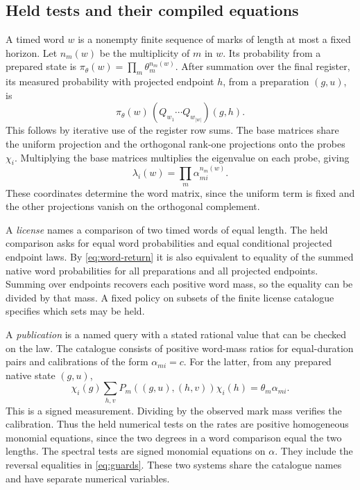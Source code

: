 \subsection{Held tests and their compiled equations}\label{sec:tests}

A timed word \(w\) is a nonempty finite sequence of marks of length at most
a fixed horizon. Let \(n_m(w)\) be the multiplicity of \(m\) in \(w\).
Its probability from a prepared state is
\(\pi_\theta(w)=\prod_m\theta_m^{n_m(w)}\).
After summation over the final register, its measured probability with
projected endpoint \(h\), from a preparation \((g,u)\), is
\begin{equation}\label{eq:word-return}
 \pi_\theta(w)\,(Q_{w_1}\cdots Q_{w_{|w|}})(g,h).
\end{equation}
This follows by iterative use of the register row sums. The base matrices
share the uniform projection and the orthogonal rank-one projections onto
the probes \(\chi_i\). Multiplying the base matrices multiplies the
eigenvalue on each probe, giving
\[
 \lambda_i(w)=\prod_m\alpha_{mi}^{n_m(w)}.
\]
These coordinates determine the word matrix, since the uniform term is
fixed and the other projections vanish on the orthogonal complement.

A \emph{license} names a comparison of two timed words of equal length.
The held comparison asks for equal word probabilities and equal conditional
projected endpoint laws. By \eqref{eq:word-return} it is also equivalent
to equality of the summed native word probabilities for all preparations
and all projected endpoints. Summing over endpoints recovers each
positive word mass, so the equality can be divided by that mass.
A fixed policy on subsets of the finite license catalogue specifies which
sets may be held.

A \emph{publication} is a named query with a stated rational value
that can be checked on the law. The catalogue consists of positive
word-mass ratios for equal-duration pairs and calibrations of the
form \(\alpha_{mi}=c\). For the latter, from any prepared native state
\((g,u)\),
\begin{equation}\label{eq:signal}
 \chi_i(g)\sum_{h,v} P_m((g,u),(h,v))\chi_i(h)=\theta_m\alpha_{mi}.
\end{equation}
This is a signed measurement. Dividing by the observed mark mass verifies the
calibration. Thus the held numerical tests on the rates are positive
homogeneous monomial equations, since the two degrees in a word comparison
equal the two lengths. The spectral tests are signed monomial equations on
\(\alpha\). They include the reversal equalities in \eqref{eq:guards}.
These two systems share the catalogue names and have separate numerical
variables.

